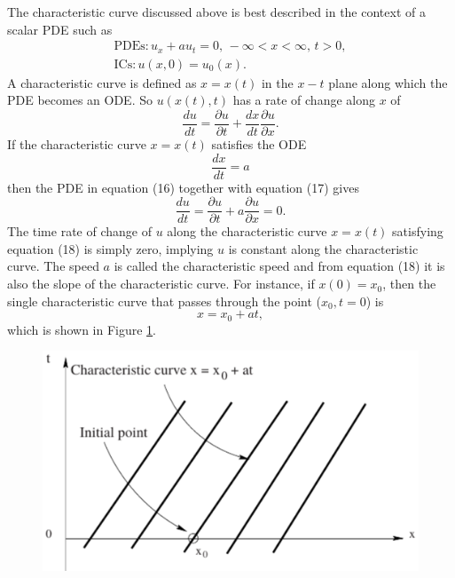\documentclass[]{article}
\begin{document}
		The characteristic curve discussed above is best described in the context of a scalar PDE such as
		\begin{equation}
			\begin{aligned}
			\mbox{PDEs} : u_x + au_t = 0 \mbox{, } -\infty 	< x < \infty \mbox{, } t > 0, \\
			\mbox{ICs}: u(x,0) = u_0(x).
			\end{aligned}
		\end{equation}
		A characteristic curve is defined as $ x = x(t) $ in the $ x-t $ plane along which the PDE becomes an ODE. So $ u(x(t),t) $ has a rate of change along $ x $ of 
		\begin{equation}
			\frac{du}{dt} = \frac{\partial u}{\partial t} + \frac{dx}{dt}\frac{\partial u}{\partial x}.
		\end{equation}
		If the characteristic curve $ x = x(t) $ satisfies the ODE
		\begin{equation}
			\frac{dx}{dt} = a
		\end{equation}
		then the PDE in equation (16) together with equation (17) gives
		\begin{equation}
			\frac{du}{dt} = \frac{\partial u}{\partial t} + a \frac{\partial u}{\partial x} = 0. 
		\end{equation}
		The time rate of change of $ u $ along the characteristic curve $ x = x(t) $ satisfying equation (18) is simply zero, implying $ u $ is constant along the characteristic curve. The speed $ a $ is called the characteristic speed and from equation (18) it is also the slope of the characteristic curve. For instance, if $ x(0) = x_0$, then the single characteristic curve that passes through the point ($ x_0, t=0 $) is
		\begin{equation}
			x = x_0 + at,
		\end{equation}
		which is shown in Figure \ref{CharacteristicCurve}.
		\begin{figure}[h] 	
			\centering
			\includegraphics[scale=.50]{CharacteristicCurve}
			\caption{}
			\label{CharacteristicCurve}
		\end{figure} 	
\end{document}
